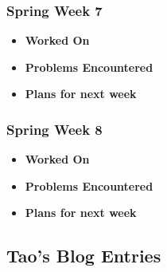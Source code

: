 \documentclass[compsoc,draftclsnofoot,onecolumn,10pt]{IEEEtran}
\begin{document}
\subsubsection{Spring Week 7}
\begin{itemize}
    \item {\textbf{Worked On}}
    \begin{itemize}

    \end{itemize}

    \item {\textbf{Problems Encountered}}
    \begin{itemize}

    \end{itemize}

    \item{\textbf{Plans for next week}}
    \begin{itemize}

    \end{itemize}

\end{itemize}

\subsubsection{Spring Week 8}
\begin{itemize}
    \item {\textbf{Worked On}}
    \begin{itemize}

    \end{itemize}

    \item {\textbf{Problems Encountered}}
    \begin{itemize}

    \end{itemize}

    \item{\textbf{Plans for next week}}
    \begin{itemize}

    \end{itemize}

\end{itemize}

\subsection{Tao's Blog Entries}
\end{document}
